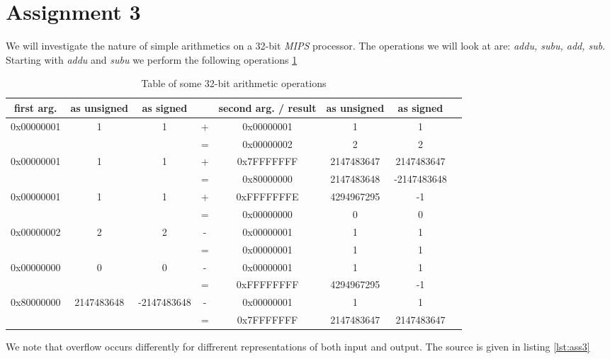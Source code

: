 \section{Assignment 3}
We will investigate the nature of simple arithmetics on a 32-bit \emph{MIPS}
processor. The operations we will look at are: \emph{addu, subu, add, sub}.
Starting with \emph{addu} and \emph{subu} we perform the following operations
\ref{optable}

 \begin{table}[ht]
\centering
\begin{tabular}{c c c c c c c c}
first arg. & as unsigned & as signed &  & second arg. / result & as unsigned &
as signed\\\hline
0x00000001 & 1 & 1 & + & 0x00000001 & 1 & 1\\
&  &  & = & 0x00000002 & 2 & 2\\ \hline
0x00000001 & 1 & 1 & + & 0x7FFFFFFF & 2147483647 & 2147483647\\
&  &  & = & 0x80000000 & 2147483648 & -2147483648\\\hline
0x00000001 & 1 & 1 & + & 0xFFFFFFFE & 4294967295 & -1\\
&  &  & = & 0x00000000 & 0 & 0\\\hline
0x00000002 & 2 & 2 & - & 0x00000001 & 1 & 1\\
&  &  & = & 0x00000001 & 1 & 1\\\hline
0x00000000 & 0 & 0 & - & 0x00000001 & 1 & 1\\
&  &  & = & 0xFFFFFFFF & 4294967295 & -1\\\hline
0x80000000 & 2147483648 & -2147483648 & - & 0x00000001 & 1 & 1\\
&  &  & = & 0x7FFFFFFF & 2147483647 & 2147483647\\\hline
\end{tabular}
\caption{Table of some 32-bit arithmetic operations}
\label{optable}
\end{table}
We note that overflow occurs differently for diffrerent representations of both
input and output. The source is given in listing \ref{lst:ass3}
